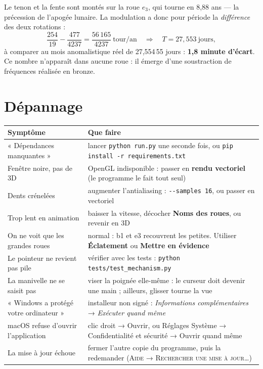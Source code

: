 \documentclass[a4paper,11pt]{article}
\begin{document}
\begin{info}
Le tenon et la fente sont montés sur la roue $e_3$, qui tourne en 8,88 ans —
la précession de l'apogée lunaire. La modulation a donc pour période la
\emph{différence} des deux rotations :
\[
  \frac{254}{19} - \frac{477}{4237} = \frac{56\,165}{4237}\ \text{tour/an}
  \quad\Longrightarrow\quad T = 27{,}553\ \text{jours},
\]
à comparer au mois anomalistique réel de 27,554\,55 jours : \textbf{1,8 minute
d'écart}. Ce nombre n'apparaît dans aucune roue : il émerge d'une soustraction
de fréquences réalisée en bronze.
\end{info}

\section{Dépannage}

\begin{center}
\begin{tabularx}{\textwidth}{@{}p{5.4cm}X@{}}
\toprule
\rowcolor{lightblue}\textbf{Symptôme} & \textbf{Que faire} \\
\midrule
« Dépendances manquantes » & lancer \texttt{python run.py} une seconde fois,
ou \texttt{pip install -r requirements.txt} \\
Fenêtre noire, pas de 3D & OpenGL indisponible : passer en \textbf{rendu
vectoriel} (le programme le fait tout seul) \\
Dents crénelées & augmenter l'antialiasing : \texttt{-{}-samples 16}, ou passer
en vectoriel \\
Trop lent en animation & baisser la vitesse, décocher \textbf{Noms des roues},
ou revenir en 3D \\
On ne voit que les grandes roues & normal : b1 et e3 recouvrent les petites.
Utiliser \textbf{Éclatement} ou \textbf{Mettre en évidence} \\
Le pointeur ne revient pas pile & vérifier avec les tests :
\texttt{python tests/test\_mechanism.py} \\
La manivelle ne se saisit pas & viser la poignée elle-même : le curseur doit
devenir une main ; ailleurs, glisser tourne la vue \\
« Windows a protégé votre ordinateur » & installeur non signé :
\emph{Informations complémentaires} → \emph{Exécuter quand même} \\
macOS refuse d'ouvrir l'application & clic droit → Ouvrir, ou Réglages
Système → Confidentialité et sécurité → Ouvrir quand même \\
La mise à jour échoue & fermer l'autre copie du programme, puis la redemander
(\textsc{Aide → Rechercher une mise à jour…}) \\
\bottomrule
\end{tabularx}
\end{center}
\end{document}
